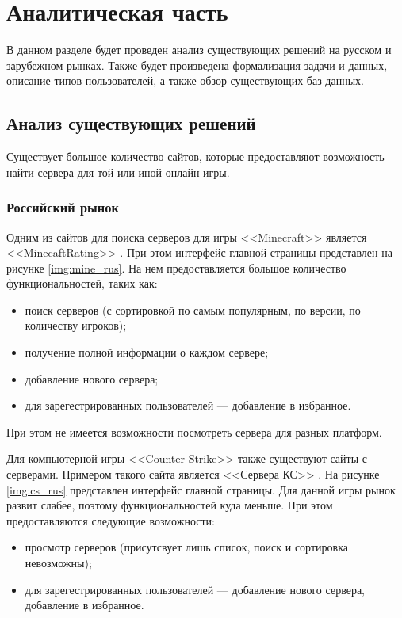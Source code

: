 \chapter{Аналитическая часть}

В данном разделе будет проведен анализ существующих решений на русском и зарубежном рынках. Также будет произведена формализация задачи и данных, описание типов пользователей, а также обзор существующих баз данных.

\section{Анализ существующих решений}

Существует большое количество сайтов, которые предоставляют возможность найти сервера для той или иной онлайн игры.


\subsection{Российский рынок}

Одним из сайтов для поиска серверов для игры <<Minecraft>> \cite{minecraft} является \newline <<MinecaftRating>> \cite{mine-rating}. При этом интерфейс главной страницы представлен на рисунке \ref{img:mine_rus}. На нем предоставляется большое количество функциональностей, таких как: 

\begin{itemize}
    \item поиск серверов (с сортировкой по самым популярным, по версии, по количеству игроков);
    \item получение полной информации о каждом сервере;
    \item добавление нового сервера;
    \item для зарегестрированных пользователей --- добавление в избранное.
\end{itemize}

При этом не имеется возможности посмотреть сервера для разных платформ.

Для компьютерной игры <<Counter-Strike>> \cite{cs} также существуют сайты с серверами. 
Примером такого сайта является <<Сервера КС>> \cite{servers-cs}. На рисунке \ref{img:cs_rus} представлен интерфейс главной страницы. Для данной игры рынок развит слабее, поэтому функциональностей куда меньше. При этом предоставляются следующие возможности:

\begin{itemize}
    \item просмотр серверов (присутсвует лишь список, поиск и сортировка невозможны); 
    \item для зарегестрированных пользователей --- добавление нового сервера, добавление в избранное.
\end{itemize}

